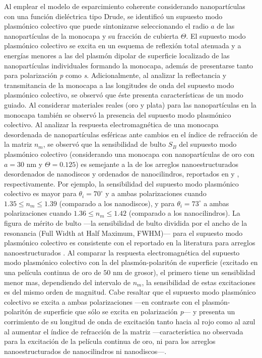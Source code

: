 Al emplear el modelo de esparcimiento coherente considerando nanopartículas con una función dieléctrica tipo Drude, se identificó un supuesto modo plasmónico colectivo que puede sintonizarse seleccionando el radio $a$ de las nanopartículas de la monocapa y su fracción de cubierta $\Theta$. El supuesto modo plasmónico colectivo se excita en un esquema de reflexión total atenuada y a energías menores a las del plasmón dipolar de superficie localizado de las nanopartículas individuales formando la monocapa, además de presentarse tanto para polarización \emph{p} como \emph{s}. Adicionalmente,  al analizar la reflectancia y transmitancia de la monocapa a las longitudes de onda del supuesto modo plasmónico colectivo, se observó que éste presenta características de un modo guiado. Al considerar materiales reales (oro y plata) para las nanopartículas en la monocapa también se observó la presencia del supuesto modo plasmónico colectivo. Al analizar la respuesta electromagnética de una  monocapa desordenada de nanopartículas esféricas ante cambios en el índice de refracción de la matriz $n_m$, se observó que la sensibilidad de bulto $S_B$ del supuesto  modo plasmónico colectivo (considerando una monocapa con nanopartículas de oro con  $a=30$ nm y $\Theta=0.125$) es semejante a la de los arreglos nanoestructurados desordenados de nanodiscos y ordenados de nanocilindros, reportados en \cite{svedendahl2009refractometric} y \cite{danilov2018ultra}, respectivamente. Por ejemplo, la sensibilidad del supuesto modo plasmónico colectivo es mayor para $\theta_i = 70^\circ$ y a ambas polarizaciones cuando $1.35 \leq n_m \leq 1.39$ (comparado a los nanodiscos), y para $\theta_i=73^\circ$ a ambas polarizaciones cuando $1.36\leq n_m \leq 1.42$ (comparado a los nanocilindros). La figura de mérito de bulto ---la sensibilidad de bulto dividida por el ancho de la resonancia (Full Width at Half Maximum, FWHM)--- para el supuesto modo plasmónico colectivo es consistente con el reportado en la literatura para arreglos nanoestructurados \cite{svedendahl2009refractometric}. Al comparar la respuesta electromagnética del supuesto modo plasmónico colectivo con la del plasmón-polaritón de superficie (excitado en una película continua de oro de $50$ nm de grosor), el primero tiene un sensiblidad menor mas, dependiendo del intervalo de $n_m$, la sensibilidad de estas excitaciones es del mismo orden de magnitud. Cabe resaltar que el supuesto modo plasmónico colectivo se excita a ambas polarizaciones ---en contraste con el plasmón-polaritón de superficie que sólo se excita en polarización \emph{p}--- y presenta un corrimiento de su longitud de onda de excitación tanto hacia al rojo como al azul al aumentar el índice de refracción de la matriz ---característica no observada para la excitación de la película continua de oro, ni para los arreglos nanoestructurados de nanocilindros ni nanodiscos---.

